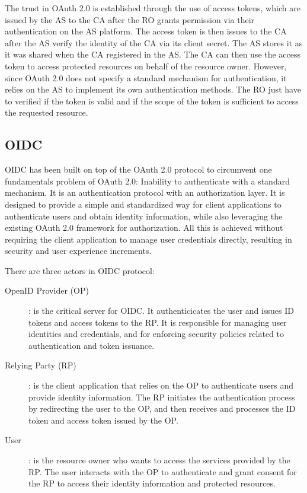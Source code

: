 \documentclass[../memoire.tex]{subfiles}
\begin{document}
The trust in OAuth 2.0 is established through the use of access tokens, which are issued by the AS to the CA after the RO grants permission via their authentication on the AS platform. The access token is then issues to the CA after the AS verify the identity of the CA via its client secret. The AS stores it as it was shared when the CA registered in the AS. The CA can then use the access token to access protected resources on behalf of the resource owner. However, since OAuth 2.0 does not specify a standard mechanism for authentication, it relies on the AS to implement its own authentication methods\cite[p.~11]{richer2017}. The RO just have to verified if the token is valid and if the scope of the token is sufficient to access the requested resource. 

\subsection{OIDC}

OIDC has been built on top of the OAuth 2.0 protocol to circumvent one fundamentals problem of OAuth 2.0: Inability to authenticate with a standard mechanism. It is an authentication protocol with an authorization layer. It is designed to provide a simple and standardized way for client applications to authenticate users and obtain identity information, while also leveraging the existing OAuth 2.0 framework for authorization. All this is achieved without requiring the client application to manage user credentials directly, resulting in security and user experience increments.

There are three actors in OIDC protocol:
\begin{description}
  \item[OpenID Provider (OP)]: is the critical server for OIDC. It authenticicates the user and issues ID tokens and access tokens to the RP. It is responsible for managing user identities and credentials, and for enforcing security policies related to authentication and token issuance.
  \item[Relying Party (RP)]: is the client application that relies on the OP to authenticate users and provide identity information. The RP initiates the authentication process by redirecting the user to the OP, and then receives and processes the ID token and access token issued by the OP.
  \item[User]: is the resource owner who wants to access the services provided by the RP. The user interacts with the OP to authenticate and grant consent for the RP to access their identity information and protected resources.
\end{description}
\end{document}
